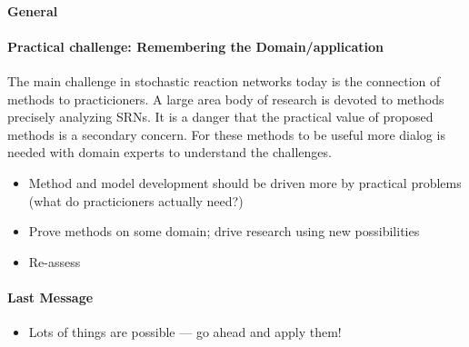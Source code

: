 \paragraph{General}
\paragraph{Practical challenge: Remembering the Domain/application} The main challenge in stochastic reaction networks today is the connection of methods to practicioners.
A large area body of research is devoted to methods precisely analyzing \acp{SRN}.
It is a danger that the practical value of proposed methods is a secondary concern.
For these methods to be useful more dialog is needed with domain experts to understand the challenges.
\begin{itemize}
    \item Method and model development should be driven more by practical problems (what do practicioners actually need?)
  \item Prove methods on some domain; drive research using new possibilities
  \item Re-assess 
\end{itemize}

\paragraph{Last Message}
\begin{itemize}
  \item Lots of things are possible --- go ahead and apply them!
\end{itemize}
